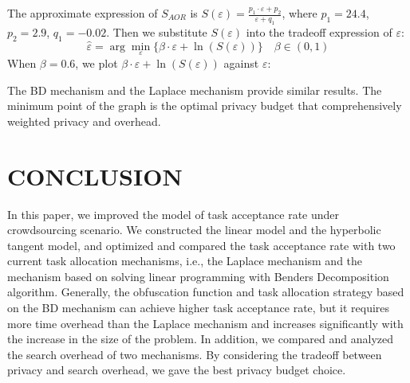 The approximate expression of $S_{AOR}$ is $S(\varepsilon)=\frac{p_1 \cdot \varepsilon + p_2}{\varepsilon+q_1}$, where $p_1=24.4$, $p_2=2.9$, $q_1=-0.02$. Then we substitute $S(\varepsilon)$ into the tradeoff expression of $\varepsilon$:
$$
	\hat{\varepsilon}=\arg \min_\varepsilon \{ \beta \cdot \varepsilon + \ln (S(\varepsilon)) \} \quad \beta \in (0,1)
$$
When $\beta=0.6$, we plot $\beta \cdot \varepsilon + \ln (S(\varepsilon))$ against $\varepsilon$:

The BD mechanism and the Laplace mechanism provide similar results. The minimum point of the graph is the optimal privacy budget that comprehensively weighted privacy and overhead.

\section{CONCLUSION} %
In this paper, we improved the model of task acceptance rate under crowdsourcing scenario. We constructed the linear model and the hyperbolic tangent model, and optimized and compared the task acceptance rate with two current task allocation mechanisms, i.e., the Laplace mechanism and the mechanism based on solving linear programming with Benders Decomposition algorithm. Generally, the obfuscation function and task allocation strategy based on the BD mechanism can achieve higher task acceptance rate, but it requires more time overhead than the Laplace mechanism and increases significantly with the increase in the size of the problem. In addition, we compared and analyzed the search overhead of two mechanisms. By considering the tradeoff between privacy and search overhead, we gave the best privacy budget choice.
